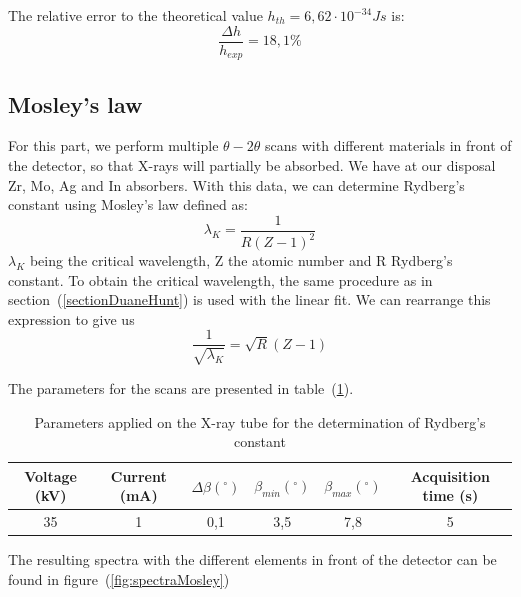 \documentclass{scrartcl}
\begin{document}
\noindent The relative error to the theoretical value $h_{th} = 6,62 \cdot 10^{-34} Js$ is:
\[\frac{\Delta h}{h_{exp}} = 18,1 \% \]

\subsection{Mosley's law}

\noindent For this part, we perform multiple $\theta-2\theta$ scans with different materials in front of the detector, so that X-rays will partially be absorbed. We have at our disposal Zr, Mo, Ag and In absorbers. With this data, we can determine Rydberg's constant using Mosley's law defined as:
\begin{equation}
    \lambda_K = \frac{1}{R(Z-1)^2}
\end{equation}
$\lambda_K$ being the critical wavelength, Z the atomic number and R Rydberg's constant. To obtain the critical wavelength, the same procedure as in section~(\ref{sectionDuaneHunt}) is used with the linear fit. We can rearrange this expression to give us \begin{equation}
    \frac{1}{\sqrt{\lambda_K}} = \sqrt{R}(Z-1)
    \label{mosleyLawRewrite}
\end{equation}

\noindent The parameters for the scans are presented in table~(\ref{tab:parametersMosley}).
\begin{table}[!ht]
    \centering
    \begin{tabular}{c|c|c|c|c|c}
    Voltage (kV) & Current (mA) & $\Delta\beta (^{\circ})$  & $\beta_{min} (^{\circ})$  &  $\beta_{max} (^{\circ})$   &  Acquisition time (s) \\ \hline
    35 & 1 & 0,1 & 3,5 & 7,8 & 5 
    \end{tabular}
    \caption{Parameters applied on the X-ray tube for the determination of Rydberg's constant}
    \label{tab:parametersMosley}
\end{table}

\noindent The resulting spectra with the different elements in front of the detector can be found in figure~(\ref{fig:spectraMosley})
\end{document}
